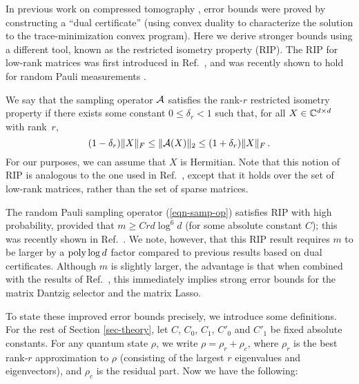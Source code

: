 In previous work on compressed tomography \cite{Gross2010, Gross2011}, error bounds were proved by constructing a ``dual certificate'' \cite{Candes2009} (using convex duality to characterize the solution to the trace-minimization convex program).  Here we derive stronger bounds using a different tool, known as the restricted isometry property (RIP).  The RIP for low-rank matrices was first introduced in Ref.~\cite{Recht2007}, and was recently shown to hold for random Pauli measurements \cite{Liu2011}.  

We say that the sampling operator $\mathcal{A}$ satisfies the rank-$r$ restricted isometry property if there exists some constant $0 \leq \delta_r < 1$ such that, for all $X \in \mathbb{C}^{d\times d}$ with rank~$r$, 
\begin{equation}
	(1-\delta_r) \lVert X\rVert_F \leq \lVert\mathcal{A}(X)\rVert_2 \leq (1+\delta_r) \lVert X\rVert_F\,.
\end{equation}
For our purposes, we can assume that $X$ is Hermitian.  Note that this notion of RIP is analogous to the one used in Ref.~\cite{Shabani2011}, except that it holds over the set of low-rank matrices, rather than the set of sparse matrices.

The random Pauli sampling operator (\ref{eqn-samp-op}) satisfies RIP with high probability, provided that $m \geq Crd\log^6 d$ (for some absolute constant $C$); this was recently shown in Ref.~\cite[Theorem 2.1]{Liu2011}. We note, however, that this RIP result requires $m$ to be larger by a $\operatorname{poly}\log d$ factor compared to previous results based on dual certificates. Although $m$ is slightly larger, the advantage is that when combined with the results of Ref.~\cite{Candes2011}, this immediately implies strong error bounds for the matrix Dantzig selector and the matrix Lasso. 

To state these improved error bounds precisely, we introduce some definitions. For the rest of Section \ref{sec-theory}, let $C$, $C_0$, $C_1$, $C'_0$ and $C'_1$ be fixed absolute constants. For any quantum state $\rho$, we write $\rho = \rho_r + \rho_c$, where $\rho_r$ is the best rank-$r$ approximation to $\rho$ (consisting of the largest $r$ eigenvalues and eigenvectors), and $\rho_c$ is the residual part. Now we have the following:

